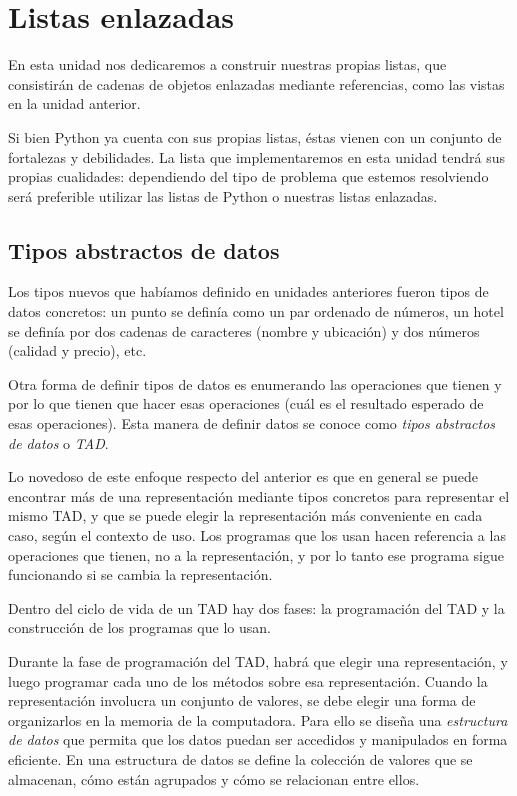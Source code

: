 \chapter{Listas enlazadas}

En esta unidad nos dedicaremos a construir nuestras propias listas, que
consistirán de cadenas de objetos enlazadas mediante referencias, como las
vistas en la unidad anterior.

Si bien Python ya cuenta con sus propias listas, éstas vienen con un conjunto
de fortalezas y debilidades. La lista que implementaremos en esta unidad
tendrá sus propias cualidades: dependiendo del tipo de problema que estemos
resolviendo será preferible utilizar las listas de Python o nuestras listas
enlazadas.

\section{Tipos abstractos de datos}

Los tipos nuevos que habíamos definido en unidades anteriores fueron tipos de
datos concretos: un punto se definía como un par ordenado de números, un hotel
se definía por dos cadenas de caracteres (nombre y ubicación) y dos números
(calidad y precio), etc.

Otra forma de definir tipos de datos es enumerando las
operaciones que tienen y por lo que tienen que hacer esas
operaciones (cuál es el resultado esperado de esas operaciones).
Esta manera de definir datos se conoce como \emph{tipos abstractos de datos} o
\emph{TAD}.

Lo novedoso de este enfoque respecto del anterior es que en general se puede
encontrar más de una representación mediante tipos concretos para representar
el mismo TAD, y que se puede elegir la representación más conveniente en cada
caso, según el contexto de uso.
Los programas que los usan hacen referencia a las operaciones que tienen, no a
la representación, y por lo tanto ese programa sigue funcionando si se cambia
la representación.

Dentro del ciclo de vida de un TAD hay dos fases: la programación del TAD y
la construcción de los programas que lo usan.

Durante la fase de programación del TAD, habrá que elegir una
representación, y luego programar cada uno de los métodos sobre esa
representación.
Cuando la representación involucra un conjunto de valores, se debe elegir una
forma de organizarlos en la memoria de la computadora. Para ello se diseña una
\emph{estructura de datos} que permita que los datos puedan ser accedidos y
manipulados en forma eficiente.  En una estructura de datos se define la
colección de valores que se almacenan, cómo están agrupados y cómo se
relacionan entre ellos.

